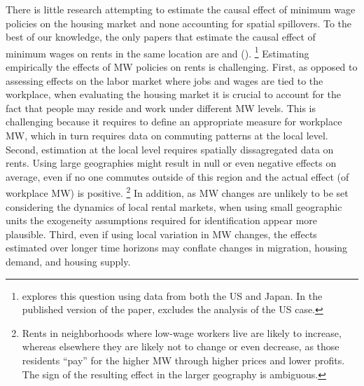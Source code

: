 
There is little research attempting to estimate the causal effect of minimum wage 
policies on the housing market and none accounting for spatial spillovers.
To the best of our knowledge, the only papers that estimate the causal effect of 
minimum wages on rents in the same location are \textcite{Tidemann2018} and 
\citeauthor{Yamagishi2019} (\citeyear{Yamagishi2019, Yamagishi2021}).%
\footnote{\textcite{Yamagishi2019} explores this question using data from both the
US and Japan. In the published version of the paper, \textcite{Yamagishi2021} 
excludes the analysis of the US case.}
Estimating empirically the effects of MW policies on rents is challenging. 
First, as opposed to assessing effects on the labor market where jobs and wages 
are tied to the workplace, when evaluating the housing market it is crucial to 
account for the fact that people may reside and work under different MW levels. 
This is challenging because it requires to define an appropriate measure for 
workplace MW, which in turn requires data on commuting patterns at the local level.
Second, estimation at the local level requires spatially dissagregated data on rents.
Using large geographies might result in null or even negative effects on average,
even if no one commutes outside of this region and the actual effect (of workplace
MW) is positive.%
\footnote{Rents in neighborhoods where low-wage workers live are likely to 
increase, whereas elsewhere they are likely not to change or even decrease, as 
those residents ``pay'' for the higher MW through higher prices and lower profits.
The sign of the resulting effect in the larger geography is ambiguous.}
In addition, as MW changes are unlikely to be set considering the dynamics of 
local rental markets, when using small geographic units the exogeneity assumptions 
required for identification appear more plausible.
Third, even if using local variation in MW changes, the effects estimated over 
longer time horizons may conflate changes in migration, housing demand, and 
housing supply.


